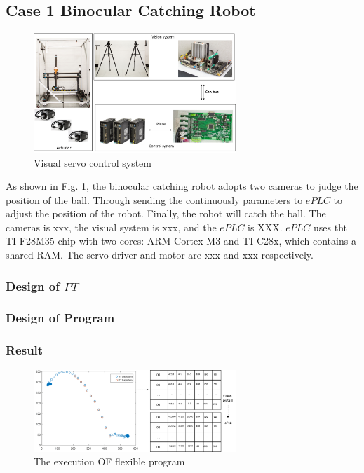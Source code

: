 \documentclass[journal,UTF8]{IEEEtran}
\begin{document}
\subsection{Case 1 Binocular Catching Robot}
\begin{figure}
	\centering
	\includegraphics[width=3in]{fig/visual_control_system.png}
	\caption{ Visual servo control system}
	\label{fig:catchRobot}
\end{figure}
As shown in Fig. \ref{fig:catchRobot}, the binocular catching robot adopts two cameras to judge the position of the ball. Through sending the continuously parameters to $ePLC$ to adjust the position of the robot. Finally, the robot will catch the ball. The cameras is xxx, the visual system is xxx, and the $ePLC$ is XXX. $ePLC$ uses tht TI F28M35 chip with two cores: ARM Cortex M3 and TI C28x, which contains a shared RAM. The servo driver and motor are xxx and xxx respectively. 
\subsubsection{Design of $PT$}

\subsubsection{Design of Program}

\subsubsection{Result}



\begin{figure}
	\centering
	\includegraphics[width=3in]{fig/trajectory.png}
	\caption{ The execution OF flexible program}
	\label{fig:settingexecutionbitinACPTD}
\end{figure}
\end{document}
